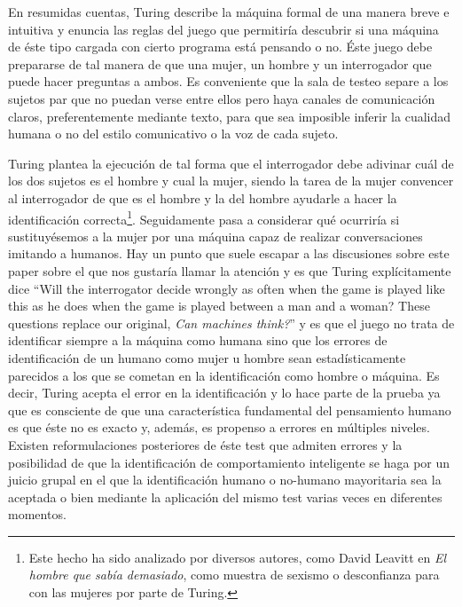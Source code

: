 \documentclass[12pt]{memoir}
\begin{document}
En resumidas cuentas, Turing describe la máquina formal de una manera breve e intuitiva y enuncia las reglas del juego que permitiría descubrir si una máquina de éste tipo cargada con cierto programa está pensando o no. Éste juego debe prepararse de tal manera de que una mujer, un hombre y un interrogador que puede hacer preguntas a ambos. Es conveniente que la sala de testeo separe a los sujetos par que no puedan verse entre ellos pero haya canales de comunicación claros, preferentemente mediante texto, para que sea imposible inferir la cualidad humana o no del estilo comunicativo o la voz de cada sujeto. 

Turing plantea la ejecución de tal forma que el interrogador debe adivinar cuál de los dos sujetos es el hombre y cual la mujer, siendo la tarea de la mujer convencer al interrogador de que es el hombre y la del hombre ayudarle a hacer la identificación correcta\footnote{Este hecho ha sido analizado por diversos autores, como David Leavitt en \textit{El hombre que sabía demasiado}, como muestra de sexismo o desconfianza para con las mujeres por parte de Turing.}. Seguidamente pasa a considerar qué ocurriría si sustituyésemos a la mujer por una máquina capaz de realizar conversaciones imitando a humanos. Hay un punto que suele escapar a las discusiones sobre este paper sobre el que nos gustaría llamar la atención y es que Turing explícitamente dice ``Will the interrogator decide wrongly as often when the game is played like this as he does when the game is played between a man and a woman? These questions replace our original, \textit{Can machines think?}'' y es que el juego no trata de identificar siempre a la máquina como humana sino que los errores de identificación de un humano como mujer u hombre sean estadísticamente parecidos a los que se cometan en la identificación como hombre o máquina. Es decir, Turing acepta el error en la identificación y lo hace parte de la prueba ya que es consciente de que una característica fundamental del pensamiento humano es que éste no es exacto y, además, es propenso a errores en múltiples niveles. Existen reformulaciones posteriores de éste test que admiten errores y la posibilidad de que la identificación de comportamiento inteligente se haga por un juicio grupal en el que la identificación humano o no-humano mayoritaria sea la aceptada o bien mediante la aplicación del mismo test varias veces en diferentes momentos.
\end{document}
